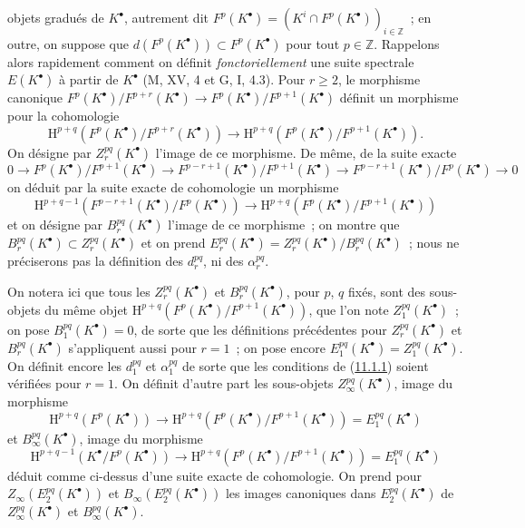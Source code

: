 objets gradués de $K^\bullet$, autrement dit
$F^p(K^\bullet)=(K^i\cap F^p(K^\bullet))_{i\in\mathbb Z}$~; en outre, on
suppose que $d(F^p(K^\bullet))\subset F^p(K^\bullet)$ pour tout
$p\in\mathbb Z$. Rappelons alors rapidement comment on définit
\emph{fonctoriellement} une suite spectrale $E(K^\bullet)$ à partir de
$K^\bullet$ (M, XV, 4 et G, I, 4.3). Pour $r\geq2$, le morphisme canonique
$F^p(K^\bullet)/F^{p+r}(K^\bullet)\to
F^p(K^\bullet)/F^{p+1}(K^\bullet)$ définit un morphisme pour la cohomologie
\[
  \mathrm H^{p+q}(F^p(K^\bullet)/F^{p+r}(K^\bullet))
  \longrightarrow
  \mathrm H^{p+q}(F^p(K^\bullet)/F^{p+1}(K^\bullet)).
\]
On désigne par $Z_r^{pq}(K^\bullet)$ l'image de ce morphisme. De même, de la
suite exacte
\[
  0\to F^p(K^\bullet)/F^{p+1}(K^\bullet)
  \to F^{p-r+1}(K^\bullet)/F^{p+1}(K^\bullet)
  \to F^{p-r+1}(K^\bullet)/F^p(K^\bullet)\to0
\]
on déduit par la suite exacte de cohomologie un morphisme
\[
  \mathrm H^{p+q-1}(F^{p-r+1}(K^\bullet)/F^p(K^\bullet))
  \longrightarrow
  \mathrm H^{p+q}(F^p(K^\bullet)/F^{p+1}(K^\bullet))
\]
et on désigne par $B_r^{pq}(K^\bullet)$ l'image de ce morphisme~; on montre
que $B_r^{pq}(K^\bullet)\subset Z_r^{pq}(K^\bullet)$ et on prend
$E_r^{pq}(K^\bullet)=Z_r^{pq}(K^\bullet)/B_r^{pq}(K^\bullet)$~; nous ne
préciserons pas la définition des $d_r^{pq}$, ni des $\alpha_r^{pq}$.

On notera ici que tous les $Z_r^{pq}(K^\bullet)$ et
$B_r^{pq}(K^\bullet)$, pour $p$, $q$ fixés, sont des sous-objets du même
objet
$\mathrm H^{p+q}(F^p(K^\bullet)/F^{p+1}(K^\bullet))$, que l'on note
$Z_1^{pq}(K^\bullet)$~; on pose $B_1^{pq}(K^\bullet)=0$, de sorte que les
définitions précédentes pour $Z_r^{pq}(K^\bullet)$ et
$B_r^{pq}(K^\bullet)$ s'appliquent aussi pour $r=1$~; on pose encore
$E_1^{pq}(K^\bullet)=Z_1^{pq}(K^\bullet)$. On définit encore les $d_1^{pq}$
et $\alpha_1^{pq}$ de sorte que les conditions de
(\hyperref[0.11.1.1-fr]{11.1.1}) soient vérifiées pour $r=1$. On définit
d'autre part les sous-objets $Z_\infty^{pq}(K^\bullet)$, image du morphisme
\[
  \mathrm H^{p+q}(F^p(K^\bullet))\longrightarrow
  \mathrm H^{p+q}(F^p(K^\bullet)/F^{p+1}(K^\bullet))
  =E_1^{pq}(K^\bullet)
\]
et $B_\infty^{pq}(K^\bullet)$, image du morphisme
\[
  \mathrm H^{p+q-1}(K^\bullet/F^p(K^\bullet))\longrightarrow
  \mathrm H^{p+q}(F^p(K^\bullet)/F^{p+1}(K^\bullet))
  =E_1^{pq}(K^\bullet)
\]
déduit comme ci-dessus d'une suite exacte de cohomologie. On prend pour
$Z_\infty(E_2^{pq}(K^\bullet))$ et $B_\infty(E_2^{pq}(K^\bullet))$ les
images canoniques dans $E_2^{pq}(K^\bullet)$ de
$Z_\infty^{pq}(K^\bullet)$ et $B_\infty^{pq}(K^\bullet)$.

